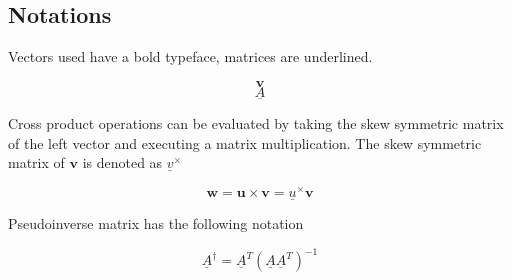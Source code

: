 \subsection{Notations}

Vectors used have a bold typeface, matrices are underlined. 

\begin{equation*}
\textbf{v}
\end{equation*}
\begin{equation*}
\underline{A}
\end{equation*}

Cross product operations can be evaluated by taking the skew symmetric matrix of the left vector and executing a matrix multiplication. The skew symmetric matrix of $\textbf{v}$ is denoted as $\underline{v}^\times$

\begin{equation*}
	\textbf{w} = \textbf{u} \times \textbf{v} = \underline{u}^\times \textbf{v}
\end{equation*}

Pseudoinverse matrix has the following notation

\begin{equation}
 \underline{A}^\dagger    =  \underline{A}^T  (\underline{A} \underline{A}^T)^{-1}
\end{equation}